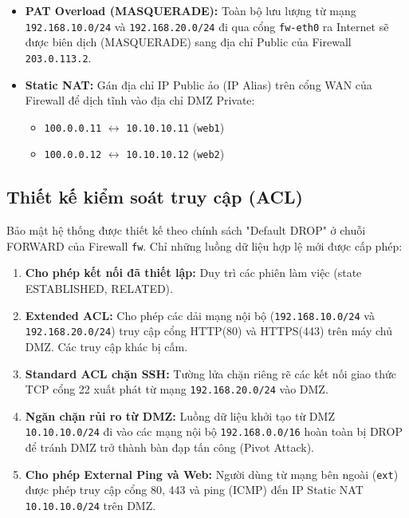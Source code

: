 \begin{itemize}
    \item \textbf{PAT Overload (MASQUERADE):} Toàn bộ lưu lượng từ mạng \texttt{192.168.10.0/24} và \texttt{192.168.20.0/24} đi qua cổng \texttt{fw-eth0} ra Internet sẽ được biên dịch (MASQUERADE) sang địa chỉ Public của Firewall \texttt{203.0.113.2}.
    \item \textbf{Static NAT:} Gán địa chỉ IP Public ảo (IP Alias) trên cổng WAN của Firewall để dịch tĩnh vào địa chỉ DMZ Private:
    \begin{itemize}
        \item \texttt{100.0.0.11} $\leftrightarrow$ \texttt{10.10.10.11} (\texttt{web1})
        \item \texttt{100.0.0.12} $\leftrightarrow$ \texttt{10.10.10.12} (\texttt{web2})
    \end{itemize}
\end{itemize}

\subsection{Thiết kế kiểm soát truy cập (ACL)}
Bảo mật hệ thống được thiết kế theo chính sách "Default DROP" ở chuỗi FORWARD của Firewall \texttt{fw}. Chỉ những luồng dữ liệu hợp lệ mới được cấp phép:

\begin{enumerate}
    \item \textbf{Cho phép kết nối đã thiết lập:} Duy trì các phiên làm việc (state ESTABLISHED, RELATED).
    \item \textbf{Extended ACL:} Cho phép các dải mạng nội bộ (\texttt{192.168.10.0/24} và \texttt{192.168.20.0/24}) truy cập cổng HTTP(80) và HTTPS(443) trên máy chủ DMZ. Các truy cập khác bị cấm.
    \item \textbf{Standard ACL chặn SSH:} Tường lửa chặn riêng rẽ các kết nối giao thức TCP cổng 22 xuất phát từ mạng \texttt{192.168.20.0/24} vào DMZ.
    \item \textbf{Ngăn chặn rủi ro từ DMZ:} Luồng dữ liệu khởi tạo từ DMZ \texttt{10.10.10.0/24} đi vào các mạng nội bộ \texttt{192.168.0.0/16} hoàn toàn bị DROP để tránh DMZ trở thành bàn đạp tấn công (Pivot Attack).
    \item \textbf{Cho phép External Ping và Web:} Người dùng từ mạng bên ngoài (\texttt{ext}) được phép truy cập cổng 80, 443 và ping (ICMP) đến IP Static NAT \texttt{10.10.10.0/24} trên DMZ.
\end{enumerate}

